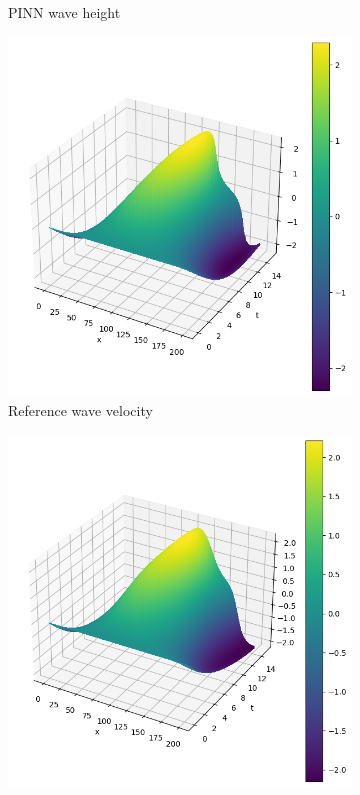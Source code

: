 \begin{figure}[h]
\begin{subfigure}[b]{0.45\textwidth}
        \caption{PINN wave height}
        \label{fig:homogeneous_pinn_swe_height}
    \end{subfigure}
    \begin{subfigure}[b]{0.45\textwidth}
        \centering
        \includegraphics[width=\textwidth]{images/homogeneous_swe_pseudospectral_velocity.png}
        \caption{Reference wave velocity}
        \label{fig:homogeneous_pseudospectral_swe_velocity}
    \end{subfigure}
    \hfill
    \begin{subfigure}[b]{0.45\textwidth}
        \centering
        \includegraphics[width=\textwidth]{images/homogeneous_swe_pinn_velocity.png}

\end{subfigure}
\end{figure}
